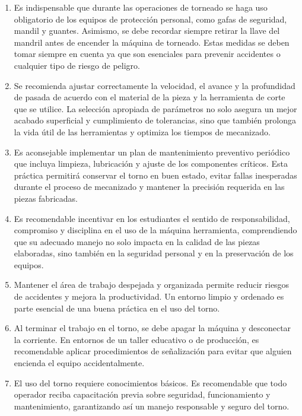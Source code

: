 \documentclass[12pt,a4paper]{article}
\begin{document}
\begin{enumerate}[itemsep=3pt, topsep=2pt, parsep=0pt]
    \item Es indispensable que durante las operaciones de torneado se haga uso obligatorio de los equipos de protección personal, como gafas de seguridad, mandil y guantes. Asimismo, se debe recordar siempre retirar la llave del mandril antes de encender la máquina de torneado. Estas medidas se deben tomar siempre en cuenta ya que son esenciales para prevenir accidentes o cualquier tipo de riesgo de peligro.

    \item Se recomienda ajustar correctamente la velocidad, el avance y la profundidad de pasada de acuerdo con el material de la pieza y la herramienta de corte que se utilice. La selección apropiada de parámetros no solo asegura un mejor acabado superficial y cumplimiento de tolerancias, sino que también prolonga la vida útil de las herramientas y optimiza los tiempos de mecanizado.

    \item Es aconsejable implementar un plan de mantenimiento preventivo periódico que incluya limpieza, lubricación y ajuste de los componentes críticos. Esta práctica permitirá conservar el torno en buen estado, evitar fallas inesperadas durante el proceso de mecanizado y mantener la precisión requerida en las piezas fabricadas.

    \item Es recomendable incentivar en los estudiantes el sentido de responsabilidad, compromiso y disciplina en el uso de la máquina herramienta, comprendiendo que su adecuado manejo no solo impacta en la calidad de las piezas elaboradas, sino también en la seguridad personal y en la preservación de los equipos.

    \item Mantener el área de trabajo despejada y organizada permite reducir riesgos de accidentes y mejora la productividad. Un entorno limpio y ordenado es parte esencial de una buena práctica en el uso del torno.

    \item Al terminar el trabajo en el torno, se debe apagar la máquina y desconectar la corriente. En entornos de un taller educativo o de producción, es recomendable aplicar procedimientos de señalización para evitar que alguien encienda el equipo accidentalmente.

    \item El uso del torno requiere conocimientos básicos. Es recomendable que todo operador reciba capacitación previa sobre seguridad, funcionamiento y mantenimiento, garantizando así un manejo responsable y seguro del torno.
\end{enumerate}
\end{document}
